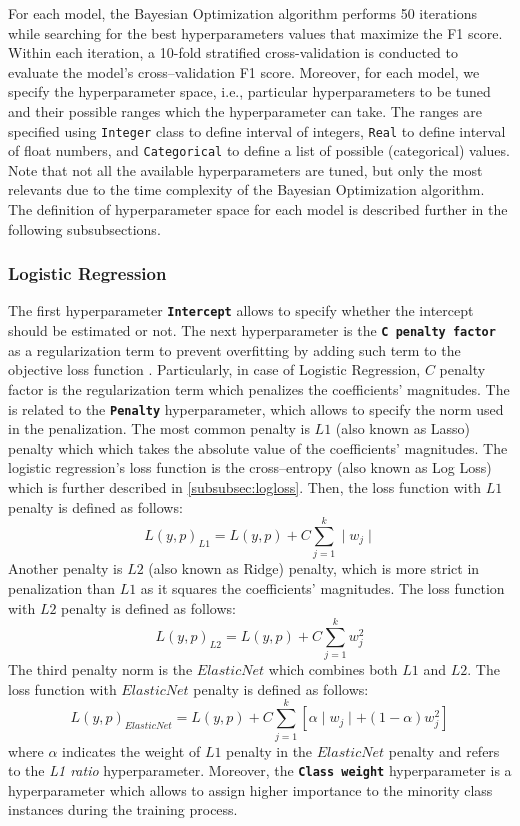 For each model, the Bayesian Optimization algorithm performs 50 iterations while searching for the best hyperparameters values that maximize the F1 score. Within each iteration, a 10-fold stratified cross-validation is conducted to evaluate the model's cross--validation F1 score.
Moreover, for each model, we specify the hyperparameter space, i.e., particular hyperparameters to be tuned and their possible ranges which the hyperparameter can take. The ranges are specified using \lstinline{Integer} class to define interval of integers, \lstinline{Real} to define interval of float numbers, and \lstinline{Categorical} to define a list of possible (categorical) values.
Note that not all the available hyperparameters are tuned, but only the most relevants due to the time complexity of the Bayesian Optimization algorithm.
The definition of hyperparameter space for each model is described further in the following subsubsections.

\subsubsection{Logistic Regression}
The first hyperparameter \textbf{\texttt{Intercept}} allows to specify whether the intercept should be estimated or not.
The next hyperparameter is the \textbf{\texttt{C penalty factor}} as a regularization term to prevent overfitting by adding such term to the objective loss function \citep{pramoditha2021mitigate}. Particularly, in case of Logistic Regression, $C$ penalty factor is the regularization term which penalizes the coefficients' magnitudes.
The is related to the \textbf{\texttt{Penalty}} hyperparameter, which allows to specify the norm used in the penalization.
The most common penalty is $L1$ (also known as Lasso) penalty which which takes the absolute value of the coefficients' magnitudes.
The logistic regression's loss function is the cross--entropy (also known as Log Loss) which is further described in \autoref{subsubsec:logloss}. Then, the loss function with  $L1$ penalty is defined as follows:
\begin{equation}\label{eq}
    L(y, p)_{L1}  = L(y, p) + C \sum_{j=1}^{k} \mid w_j \mid
\end{equation}
Another penalty is $L2$ (also known as Ridge) penalty, which is more strict in penalization than $L1$ as it squares the coefficients' magnitudes. The loss function with $L2$ penalty is defined as follows:
\begin{equation}\label{eq}
    L(y, p)_{L2}  = L(y, p) + C \sum_{j=1}^{k} w_j^2
\end{equation}
The third penalty norm is the $ElasticNet$ which combines both $L1$ and $L2$. The loss function with $ElasticNet$ penalty is defined as follows:
\begin{equation}\label{eq}
    L(y, p)_{ElasticNet} = L(y, p) + C \sum_{j=1}^{k} \left[ \alpha \mid w_j \mid + (1-\alpha) w_j^2 \right]
\end{equation}
where $\alpha$ indicates the weight of $L1$ penalty in the $ElasticNet$ penalty and refers to the \textit{L1 ratio} hyperparameter.
Moreover, the  \textbf{\texttt{Class weight}} hyperparameter is a hyperparameter which allows to assign higher importance to the minority class instances during the training process.


